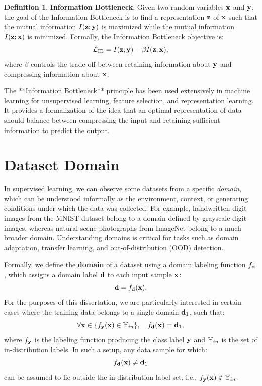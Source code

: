 \documentclass[11pt, oneside]{book}
\theoremstyle{plain}
\theoremstyle{definition}
\newtheorem{definition}[theorem]{Definition}
\theoremstyle{remark}
\begin{document}
\begin{definition}
\textbf{Information Bottleneck}: Given two random variables ${\mathbf{x}}$ and ${\mathbf{y}}$, the goal of the Information Bottleneck is to find a representation ${\mathbf{z}}$ of ${\mathbf{x}}$ such that the mutual information $I({\mathbf{z}}; {\mathbf{y}})$ is maximized while the mutual information $I({\mathbf{z}}; {\mathbf{x}})$ is minimized. Formally, the Information Bottleneck objective is:
\[
\mathcal{L}_{\text{IB}} = I({\mathbf{z}}; {\mathbf{y}}) - \beta I({\mathbf{z}}; {\mathbf{x}}),
\]
where $\beta$ controls the trade-off between retaining information about ${\mathbf{y}}$ and compressing information about ${\mathbf{x}}$.
\label{def:ib}
\end{definition}

The **Information Bottleneck** principle has been used extensively in machine learning for unsupervised learning, feature selection, and representation learning. It provides a formalization of the idea that an optimal representation of data should balance between compressing the input and retaining sufficient information to predict the output.

\section{Dataset Domain}

In supervised learning, we can observe some datasets from a specific \textit{domain}, which can be understood informally as the environment, context, or generating conditions under which the data was collected. For example, handwritten digit images from the MNIST dataset belong to a domain defined by grayscale digit images, whereas natural scene photographs from ImageNet belong to a much broader domain. Understanding domains is critical for tasks such as domain adaptation, transfer learning, and out-of-distribution (OOD) detection.

Formally, we define the \textbf{domain} of a dataset using a domain labeling function \( f_{{\mathbf{d}}} \), which assigns a domain label \( {\mathbf{d}} \) to each input sample \( {\mathbf{x}} \):
\[
{\mathbf{d}} = f_{{\mathbf{d}}}({\mathbf{x}}).
\]
For the purposes of this dissertation, we are particularly interested in certain cases where the training data belongs to a single domain \( {\mathbf{d}}_1 \), such that:
\[
\forall {\mathbf{x}} \in \{ f_{{\mathbf{y}}}({\mathbf{x}}) \in {\mathbb{Y}}_{in} \}, \quad f_{{\mathbf{d}}}({\mathbf{x}}) = {\mathbf{d}}_1,
\]
where \( f_{{\mathbf{y}}} \) is the labeling function producing the class label \( {\mathbf{y}} \) and \( {\mathbb{Y}}_{in} \) is the set of in-distribution labels. In such a setup, any data sample for which:
\[
f_{{\mathbf{d}}}({\mathbf{x}}) \neq {\mathbf{d}}_1
\]
can be assumed to lie outside the in-distribution label set, i.e., \( f_{{\mathbf{y}}}({\mathbf{x}}) \notin {\mathbb{Y}}_{in} \).
\end{document}
